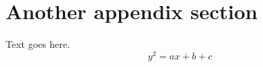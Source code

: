 \section{Another appendix section}
    Text goes here.
    \begin{equation}
    y^2=ax+b+c
    \end{equation}
